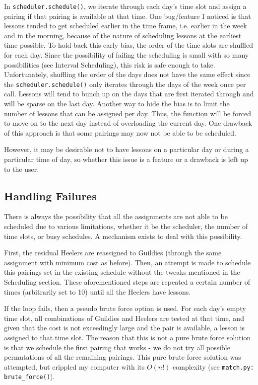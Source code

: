 \documentclass[letterpaper]{article}
\begin{document}
In \texttt{scheduler.schedule()}, we iterate through each day's time slot and assign a pairing if that pairing is
available at that time. One bug/feature I noticed is that lessons tended to get scheduled earlier in the time frame,
i.e. earlier in the week and in the morning, because of the nature of scheduling lessons at the earliest time possible.
To hold back this early bias, the order of the time slots are shuffled for each day. Since the possibility of failing the scheduling is
small with so many possibilities (see Interval Scheduling), this risk is safe enough to take. Unfortunately, shuffling
the order of the days does not have the same effect since the \texttt{scheduler.schedule()} only iterates through the
days of the week once per call. Lessons will tend to bunch up on the days that are first iterated through and will be
sparse on the last day. Another way to hide the bias is to limit the number of lessons that can be assigned per day.
Thus, the function will be forced to move on to the next day instead of overloading the current day. One drawback of
this approach is that some pairings may now not be able to be scheduled.

However, it may be desirable not to have lessons on a particular day or during a particular time of day, so whether this
issue is a feature or a drawback is left up to the user.

\subsection{Handling Failures}
There is always the possibility that all the assignments are not able to be scheduled due to various limitations,
whether it be the scheduler, the number of time slots, or busy schedules. A mechanism exists to deal with this
possibility.

First, the residual Heelers are reassigned to Guildies (through the same assignment with minimum cost as before). Then,
an attempt is made to schedule this pairings set in the existing schedule without the tweaks mentioned in the Scheduling
section. These aforementioned steps are repeated a certain number of times (arbitrarily set to 10) until all the Heelers
have lessons.

If the loop fails, then a pseudo brute force option is used. For each day's empty time slot, all combinations of Guildies and
Heelers are tested at that time, and given that the cost is not exceedingly large and the pair is available, a lesson is
assigned to that time slot. The reason that this is not a pure brute force solution is that we schedule the first
pairing that works - we do not try all possible permutations of all the remaining pairings. This pure brute force
solution was attempted, but crippled my computer with its $O(n!)$ complexity (see \texttt{match.py:
brute\_force()}).
\end{document}
